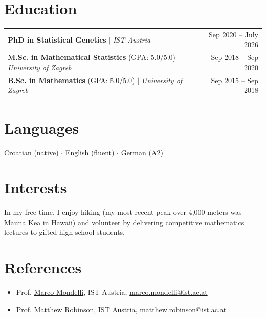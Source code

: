 \documentclass[a4paper,11pt]{article}
\begin{document}
\section{Education}
\begin{tabularx}{\linewidth}{@{} X r @{}}
    \textbf{PhD in Statistical Genetics} $|$ \textit{IST Austria} & Sep 2020 -- July 2026 \\
    \textbf{M.Sc. in Mathematical Statistics} (GPA: 5.0/5.0) $|$ \textit{University of Zagreb} & Sep 2018 -- Sep 2020 \\
    \textbf{B.Sc. in Mathematics} (GPA: 5.0/5.0) $|$ \textit{University of Zagreb} & Sep 2015 -- Sep 2018 \\
\end{tabularx}

\section{Languages}
Croatian (native) $\cdot$ English (fluent) $\cdot$ German (A2)

\section{Interests}
In my free time, I enjoy hiking (my most recent peak over 4,000 meters was Mauna Kea in Hawaii) and volunteer by delivering competitive mathematics lectures to gifted high-school students.

\section{References}
\begin{itemize}
    \item[--] Prof. \href{http://marcomondelli.com}{Marco Mondelli}, IST Austria, \url{marco.mondelli@ist.ac.at}
    \item[--] Prof. \href{https://ist.ac.at/de/forschung/robinson-gruppe/}{Matthew Robinson}, IST Austria, \url{matthew.robinson@ist.ac.at}
\end{itemize}
\end{document}
